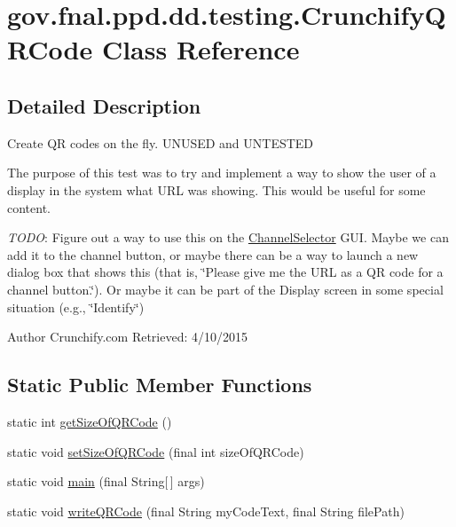\hypertarget{classgov_1_1fnal_1_1ppd_1_1dd_1_1testing_1_1CrunchifyQRCode}{\section{gov.\-fnal.\-ppd.\-dd.\-testing.\-Crunchify\-Q\-R\-Code Class Reference}
\label{classgov_1_1fnal_1_1ppd_1_1dd_1_1testing_1_1CrunchifyQRCode}
}


\subsection{Detailed Description}
Create Q\-R codes on the fly. U\-N\-U\-S\-E\-D and U\-N\-T\-E\-S\-T\-E\-D 

The purpose of this test was to try and implement a way to show the user of a display in the system what U\-R\-L was showing. This would be useful for some content. 

{\itshape T\-O\-D\-O}\-: Figure out a way to use this on the \hyperlink{classgov_1_1fnal_1_1ppd_1_1dd_1_1ChannelSelector}{Channel\-Selector} G\-U\-I. Maybe we can add it to the channel button, or maybe there can be a way to launch a new dialog box that shows this (that is, \char`\"{}\-Please give me the U\-R\-L as a Q\-R code for a channel button.\char`\"{}). Or maybe it can be part of the Display screen in some special situation (e.\-g., \char`\"{}\-Identify\char`\"{}) 

\begin{DoxyAuthor}{Author}
Crunchify.\-com Retrieved\-: 4/10/2015 
\end{DoxyAuthor}
\subsection*{Static Public Member Functions}
\begin{DoxyCompactItemize}
\item 
static int \hyperlink{classgov_1_1fnal_1_1ppd_1_1dd_1_1testing_1_1CrunchifyQRCode_af4be69ca0eb9d5feb41321c2e83ec82c}{get\-Size\-Of\-Q\-R\-Code} ()
\item 
static void \hyperlink{classgov_1_1fnal_1_1ppd_1_1dd_1_1testing_1_1CrunchifyQRCode_a1ebe1abb8380d254de65ba4879e2ae5e}{set\-Size\-Of\-Q\-R\-Code} (final int size\-Of\-Q\-R\-Code)
\item 
static void \hyperlink{classgov_1_1fnal_1_1ppd_1_1dd_1_1testing_1_1CrunchifyQRCode_aaca0af77f34556399df2292994d3c4f5}{main} (final String\mbox{[}$\,$\mbox{]} args)
\item 
static void \hyperlink{classgov_1_1fnal_1_1ppd_1_1dd_1_1testing_1_1CrunchifyQRCode_a2d32209f16dc9bd5b114512ed653fb7a}{write\-Q\-R\-Code} (final String my\-Code\-Text, final String file\-Path)
\end{DoxyCompactItemize}


